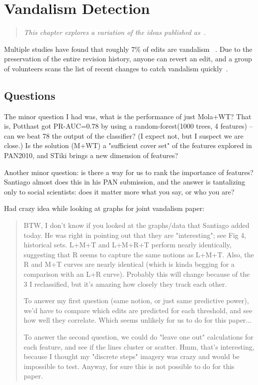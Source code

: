 \chapter{Vandalism Detection}
\label{ch:vandalism}

\begin{quote}
\textit{This chapter explores a variation of the ideas
published as~\cite{Adler2010}.}
\end{quote}

Multiple studies have found that roughly 7\% of edits are
vandalism~\cite{Potthast2008,Potthast2010a} .
Due to the preservation of the entire revision history,
anyone can revert an edit, and a group of volunteers scans the
list of recent changes to catch vandalism
quickly~\cite{wiki:RCPatrol}.







\section{Questions}


The minor question I had was, what is the performance of just Mola+WT?
That is, Potthast got PR-AUC=0.78 by using a random-forest(1000 trees,
4 features) -- can we beat 78%
the output of the classifier?  (I expect not, but I suspect we are
close.)  Is the solution (M+WT) a "sufficient cover set" of the
features explored in PAN2010, and STiki brings a new dimension of
features?

Another minor question: is there a way for us to rank the importance
of features?  Santiago almost does this in his PAN submission, and the
answer is tantalizing only to social scientists: does it matter more
what you say, or who you are?

Had crazy idea while looking at graphs for joint vandalism paper:
\begin{quote}
BTW, I don't know if you looked at the graphs/data that Santiago added today.  He was right in pointing out that they are "interesting"; see Fig 4, historical sets.  L+M+T and L+M+R+T perform nearly identically, suggesting that R seems to capture the same notions as L+M+T.  Also, the R and M+T curves are nearly identical (which is kinda begging for a comparison with an L+R curve).  Probably this will change because of the 3 I reclassified, but it's amazing how closely they track each other.

To answer my first question (same notion, or just same predictive power), we'd have to compare which edits are predicted for each threshold, and see how well they correlate.  Which seems unlikely for us to do for this paper...

To answer the second question, we could do "leave one out" calculations for each feature, and see if the lines cluster or scatter.  Hmm, that's interesting, because I thought my "discrete steps" imagery was crazy and would be impossible to test.  Anyway, for sure this is not possible to do for this paper.
\end{quote}


